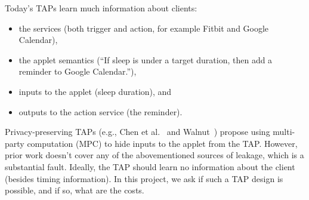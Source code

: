 Today's TAPs learn much information about clients:
\begin{itemize}[leftmargin=*]
  \item the services (both trigger and action, for example Fitbit and Google Calendar),
  \item the applet semantics (``If sleep is under a target duration, then add a
    reminder to Google Calendar.''),
  \item inputs to the applet (sleep duration), and
  \item outputs to the action service (the reminder).
\end{itemize}


Privacy-preserving TAPs (e.g., Chen et al.~\cite{DBLP:conf/sp/ChenCWSCF21} and 
Walnut~\cite{DBLP:journals/corr/abs-2009-12447}) propose using multi-party computation (MPC) to hide
inputs to the applet from the TAP. However, prior work doesn't cover any of the abovementioned 
sources of leakage, which is a substantial fault. Ideally, the TAP should learn no information about the
client (besides timing information). In this project, we ask if such a TAP design is possible, and if
so, what are the costs. 
